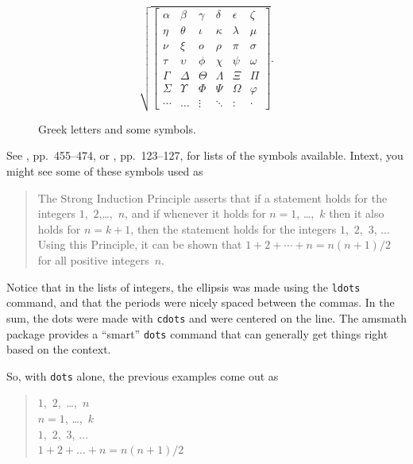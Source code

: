 \documentclass{icmmcm}
\newcommand{\bslash}{\symbol{'134}}%
\newcommand{\bsl}{{\texttt{\bslash}}}
\newcommand{\com}[1]{\bsl\texttt{#1}\xspace}
\newcommand{\package}[1]{\textsf{#1}\xspace}
\begin{document}
{\begin{figure}
  \begin{center}
    \begin{equation}
      \sqrt{ 
        \left[ 
          \begin{array}{cccccc}
            \alpha & \beta    & \gamma & \delta  & \epsilon & \zeta  \\
            \eta   & \theta   & \iota  & \kappa  & \lambda  & \mu    \\
            \nu    & \xi      & o      & \rho    & \pi      & \sigma \\ 
            \tau   & \upsilon & \phi   & \chi    & \psi     & \omega \\
            \Gamma & \Delta   & \Theta & \Lambda & \Xi      & \Pi    \\
            \Sigma & \Upsilon & \Phi   & \Psi    & \Omega   & \varphi\\
            \cdots & \ldots   & \vdots & \ddots  & :        & \cdot
          \end{array} 
        \right ] }.
    \end{equation}
  \end{center}
  \caption[Greek letters and some symbols]{Greek letters and some symbols.}%
  \label{fig:greek-symbols}
\end{figure}

See \cite{gratzer-mil}, pp.~455--474, or \cite{kopka-daly-guide},
pp.~123--127, for lists of the symbols available.  Intext, you might
see some of these symbols used as
\begin{quote}
  The Strong Induction Principle asserts that if a statement holds for
  the integers $1$,~$2$,\dots,~$n$, and if whenever it holds for $n =
  1$, \dots,~$k$ then it also holds for $n = k+1$, then the statement
  holds for the integers $1$,~$2$,~$3$, $\ldots\,$ Using this
  Principle, it can be shown that $1+2+\cdots+n = n(n+1)/2$ for all
  positive integers~$n$.
\end{quote}
Notice that in the lists of integers, the ellipsis was made using the
\com{ldots} command, and that the periods were nicely spaced between
the commas. In the sum, the dots were made with \com{cdots} and were
centered on the line.  The \package{amsmath} package provides a
``smart'' \com{dots} command that can generally get things right based
on the context.

So, with \com{dots} alone, the previous examples come out as
\begin{quote}
$1$,~$2$,~\dots,~$n$\\
$n = 1$, \dots,~$k$\\
$1$,~$2$,~$3$, $\dots\,$\\
$1+2+\dots+n = n(n+1)/2$
\end{quote}

}
\end{document}
